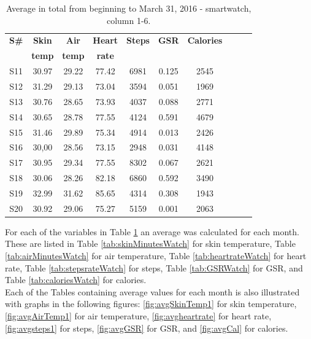 \documentclass[12pt]{article} %
\begin{document}
\begin{table}[H]
\center
\begin{footnotesize}
	\begin{tabular}{| c | c | c | c | c | c | c | c | c | c |}
	\hline
	\textbf{S\#} & \textbf{Skin} & \textbf{Air} & \textbf{Heart} & \textbf{Steps} & \textbf{GSR} & \textbf{Calories}\\
	 & \textbf{temp} & \textbf{temp} & \textbf{rate} & & & \\
	
	\hline
	S11 & 30.97 & 29.22 & 77.42 & 6981 & 0.125 & 2545 \\
	\hline
	S12 & 31.29 & 29.13 & 73.04 & 3594 & 0.051 & 1969 \\
	\hline
	S13 & 30.76 & 28.65 & 73.93 & 4037 & 0.088 & 2771 \\
	\hline
	S14 & 30.65 & 28.78 & 77.55 & 4124 & 0.591 & 4679 \\
	\hline
	S15 & 31.46 & 29.89 & 75.34 & 4914 & 0.013 & 2426 \\
	\hline
	S16 & 30,00 & 28.56 & 73.15 & 2948 & 0.031 & 4148 \\
	\hline
	S17 & 30.95 & 29.34 & 77.55 & 8302 & 0.067 & 2621 \\
	\hline
	S18 & 30.06 & 28.26 & 82.18 & 6860 & 0.592 & 3490 \\
	\hline
	S19 & 32.99 & 31.62 & 85.65 & 4314 & 0.308 & 1943 \\
	\hline
	S20 & 30.92 & 29.06 & 75.27 & 5159 & 0.001 & 2063 \\
	\hline
	\end{tabular}
	\caption{Average in total from beginning to March 31, 2016 - smartwatch, column 1-6.}
	\label{tab:averageTotal}
\end{footnotesize}
\end{table}

For each of the variables in Table \ref{tab:averageTotal} an average was calculated for each month. These are listed in Table \ref{tab:skinMinutesWatch} for skin temperature, Table \ref{tab:airMinutesWatch} for air temperature, Table \ref{tab:heartrateWatch} for heart rate, Table \ref{tab:stepsrateWatch} for steps, Table \ref{tab:GSRWatch} for GSR, and Table \ref{tab:caloriesWatch} for calories. \\

Each of the Tables containing average values for each month is also illustrated with graphs in the following figures: \ref{fig:avgSkinTemp1} for skin temperature, \ref{fig:avgAirTemp1} for air temperature, \ref{fig:avgheartrate} for heart rate, \ref{fig:avgsteps1} for steps, \ref{fig:avgGSR} for GSR, and \ref{fig:avgCal} for calories. 
\end{document}
